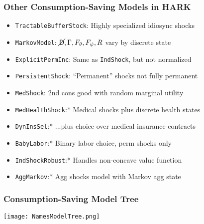 \documentclass[11ptt]{beamer}
\newcommand{\Die}{\mathsf{D}}
\newcommand{\Live}{\cancel{\Die}}
\begin{document}
\begin{frame}
\frametitle{Other Consumption-Saving Models in HARK}
\begin{itemize}
\item <1->\texttt{TractableBufferStock}: Highly specialized idiosync shocks

\item <2->\texttt{MarkovModel}: $\Live,\Gamma,F_\theta,F_\psi,R$ vary by discrete state

\item <3->\texttt{ExplicitPermInc}: Same as \texttt{IndShock}, but not normalized

\item <3->\texttt{PersistentShock}: ``Permanent'' shocks not fully permanent

\item <4->\texttt{MedShock}: 2nd cons good with random marginal utility

\item <5->\texttt{MedHealthShock}:* Medical shocks plus discrete health states

\item <5->\texttt{DynInsSel}:* ...plus choice over medical insurance contracts

\item <6->\texttt{BabyLabor}:* Binary labor choice, perm shocks only

\item <6->\texttt{IndShockRobust}:* Handles non-concave value function

\item <6->\texttt{AggMarkov}:* Agg shocks model with Markov agg state
\end{itemize}
\end{frame}


\begin{frame}
\frametitle{Consumption-Saving Model Tree}
\begin{center}
\texttt{[image: NamesModelTree.png]}
\end{center}
\end{frame}


\end{document}

